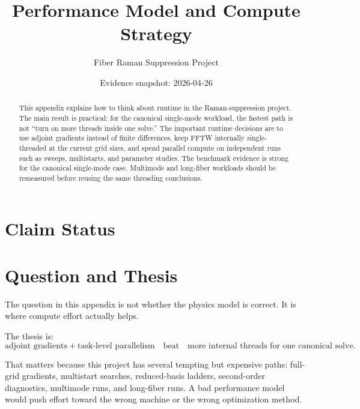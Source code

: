 \documentclass[11pt]{article}
\title{Performance Model and Compute Strategy}
\author{Fiber Raman Suppression Project}
\date{Evidence snapshot: 2026-04-26}
\begin{document}
\maketitle

\begin{abstract}
This appendix explains how to think about runtime in the Raman-suppression
project. The main result is practical: for the canonical single-mode workload,
the fastest path is not ``turn on more threads inside one solve.'' The important
runtime decisions are to use adjoint gradients instead of finite differences,
keep FFTW internally single-threaded at the current grid sizes, and spend
parallel compute on independent runs such as sweeps, multistarts, and parameter
studies. The benchmark evidence is strong for the canonical single-mode case.
Multimode and long-fiber workloads should be remeasured before reusing the same
threading conclusions.
\end{abstract}

\section*{Claim Status}

\section{Question and Thesis}

The question in this appendix is not whether the physics model is correct. It is
where compute effort actually helps.

The thesis is:
\[
    \text{adjoint gradients} + \text{task-level parallelism}
    \quad \text{beat} \quad
    \text{more internal threads for one canonical solve}.
\]

That matters because this project has several tempting but expensive paths:
full-grid gradients, multistart searches, reduced-basis ladders, second-order
diagnostics, multimode runs, and long-fiber runs. A bad performance model would
push effort toward the wrong machine or the wrong optimization method.
\end{document}
